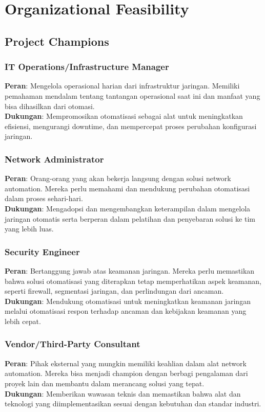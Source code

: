 \section{Organizational Feasibility}

\subsection{Project Champions}

\subsubsection{IT Operations/Infrastructure Manager}
\textbf{Peran}: Mengelola operasional harian dari infrastruktur jaringan. Memiliki pemahaman mendalam tentang tantangan operasional saat ini dan manfaat yang bisa dihasilkan dari otomasi. \\
\textbf{Dukungan}: Mempromosikan otomatisasi sebagai alat untuk meningkatkan efisiensi, mengurangi downtime, dan mempercepat proses perubahan konfigurasi jaringan.

\subsubsection{Network Administrator}
\textbf{Peran}: Orang-orang yang akan bekerja langsung dengan solusi network automation. Mereka perlu memahami dan mendukung perubahan otomatisasi dalam proses sehari-hari. \\
\textbf{Dukungan}: Mengadopsi dan mengembangkan keterampilan dalam mengelola jaringan otomatis serta berperan dalam pelatihan dan penyebaran solusi ke tim yang lebih luas.

\subsubsection{Security Engineer}
\textbf{Peran}: Bertanggung jawab atas keamanan jaringan. Mereka perlu memastikan bahwa solusi otomatisasi yang diterapkan tetap memperhatikan aspek keamanan, seperti firewall, segmentasi jaringan, dan perlindungan dari ancaman. \\
\textbf{Dukungan}: Mendukung otomatisasi untuk meningkatkan keamanan jaringan melalui otomatisasi respon terhadap ancaman dan kebijakan keamanan yang lebih cepat.

\subsubsection{Vendor/Third-Party Consultant}
\textbf{Peran}: Pihak eksternal yang mungkin memiliki keahlian dalam alat network automation. Mereka bisa menjadi champion dengan berbagi pengalaman dari proyek lain dan membantu dalam merancang solusi yang tepat. \\
\textbf{Dukungan}: Memberikan wawasan teknis dan memastikan bahwa alat dan teknologi yang diimplementasikan sesuai dengan kebutuhan dan standar industri.

